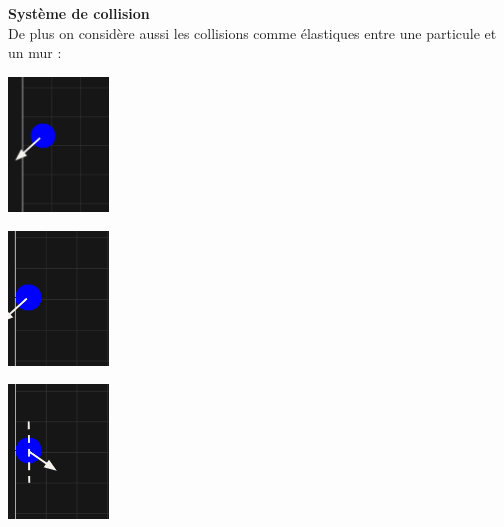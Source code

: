 \documentclass{article}
\begin{document}
\newpage
\vspace*{2pt}
\thispagestyle{landscape}
\textbf{Système de collision}\\
De plus on considère aussi les collisions comme élastiques entre une particule et un mur : \\[64pt]
\parbox{0.25\textwidth}{
    \includegraphics[width=0.20\textwidth]{CollisionM1.png}
}
\parbox{0.25\textwidth}{
    \includegraphics[width=0.20\textwidth]{CollisionM2.png}
}
\parbox{0.25\textwidth}{
    \includegraphics[width=0.20\textwidth]{CollisionM3.png}
}
\end{document}
